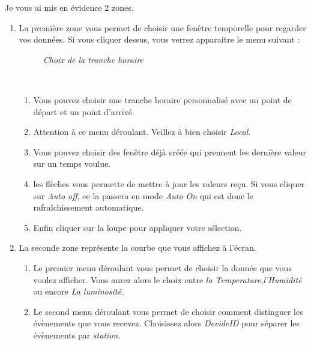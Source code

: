 Je vous ai mis en évidence 2 zones. 
\begin{enumerate}
\item La première zone vous permet de choisir une fenêtre temporelle pour regarder vos données. Si vous cliquer dessus, vous verrez apparaitre le menu suivant :\\

\begin{figure}[H]
\begin{center}
\end{center}
	\caption{ \textit{Choix de la tranche horaire}}
\end{figure}\\

\begin{enumerate}
\item Vous pouvez choisir une tranche horaire personnalisé avec un point de départ et un point d'arrivé.
\item Attention à ce menu déroulant. Veillez à bien choisir \textit{Local}.
\item Vous pouvez choisir des fenêtre déjà créée qui prennent les dernière valeur sur un temps voulue.
\item les flèches vous permette de mettre à jour les valeurs reçu. Si vous cliquer sur \textit{Auto off}, ce la passera en mode \textit{Auto On} qui est donc le rafraîchissement automatique.
\item Enfin cliquer sur la loupe pour appliquer votre sélection.
\end{enumerate}

\item La seconde zone représente la courbe que vous affichez à l'écran.
\begin{enumerate}
\item Le premier menu déroulant vous permet de choisir la donnée que vous voulez afficher. Vous aurez alors le choix entre  \textit{la Temperature},\textit{l'Humidité} ou encore \textit{La luminosité}.
\item Le second menu déroulant vous permet de choisir comment distinguer les évènements que vous recevez. Choisissez alors \textit{DevideID} pour séparer les évènements par \textit{station}. 
\end{enumerate}
\end{enumerate}













	
	




